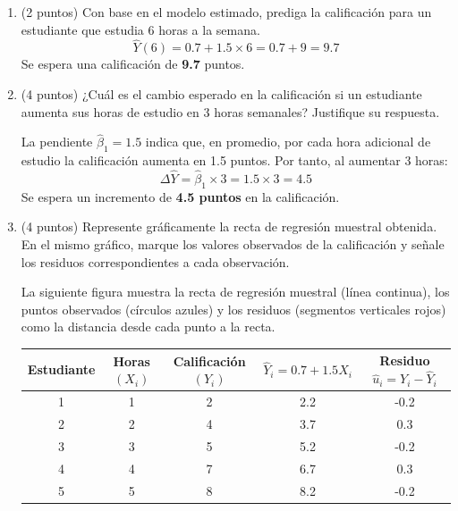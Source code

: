 \documentclass[10pt,a4paper]{article}
\begin{document}
\begin{enumerate}
\begin{enumerate}
{\color{blue} \[
\bar{X} = \frac{1+2+3+4+5}{5} = \frac{15}{5}=3, \qquad 
\bar{Y} = \frac{2+4+5+7+8}{5} = \frac{26}{5}=5.2
\]

\[
\begin{aligned}
\sum (X_i-\bar{X})(Y_i-\bar{Y}) &= (1-3)(2-5.2)+(2-3)(4-5.2)+(3-3)(5-5.2)\\
&\quad +(4-3)(7-5.2)+(5-3)(8-5.2)\\
&= (-2)(-3.2)+(-1)(-1.2)+(0)(-0.2)+(1)(1.8)+(2)(2.8)\\
&= 6.4+1.2+0+1.8+5.6 = 15
\end{aligned}
\]

\[
\sum (X_i-\bar{X})^2 = (-2)^2+(-1)^2+0^2+1^2+2^2 = 4+1+0+1+4 = 10
\]

\[
\hat{\beta}_1 = \frac{15}{10} = 1.5, \qquad 
\hat{\beta}_0 = \bar{Y} - \hat{\beta}_1\bar{X} = 5.2 - 1.5\cdot3 = 5.2 - 4.5 = 0.7
\]

Por lo tanto, el modelo estimado es:
\[
\boxed{\hat{Y}_i = 0.7 + 1.5\,X_i}
\]}


\item (2 puntos)  Con base en el modelo estimado, prediga la calificación para un estudiante que estudia 6 horas a la semana. 
{\color{blue}
\[
\hat{Y}(6) = 0.7 + 1.5 \times 6 = 0.7 + 9 = 9.7
\]
Se espera una calificación de \textbf{9.7} puntos.}


\item  (4 puntos) ¿Cuál es el cambio esperado en la calificación si un estudiante aumenta sus horas de estudio en 3 horas semanales? Justifique su respuesta.

{\color{blue}
La pendiente $\hat{\beta}_1 = 1.5$ indica que, en promedio, por cada hora adicional de estudio la calificación aumenta en 1.5 puntos. Por tanto, al aumentar 3 horas:
\[
\Delta \hat{Y} = \hat{\beta}_1 \times 3 = 1.5 \times 3 = 4.5
\]
Se espera un incremento de \textbf{4.5 puntos} en la calificación.

}
\item (4 puntos) Represente gráficamente la recta de regresión muestral obtenida. En el mismo
gráfico, marque los valores observados de la calificación y señale los residuos correspondientes a
cada observación.


La siguiente figura muestra la recta de regresión muestral (línea continua), los puntos observados (círculos azules) y los residuos (segmentos verticales rojos) como la distancia desde cada punto a la recta.

\begin{table}[h]
\centering
{\color{blue!80}
\begin{tabular}{c|c|c|c|c}
Estudiante & Horas $(X_i)$ & Calificación $(Y_i)$ & $\hat{Y}_i = 0.7 + 1.5X_i$ & Residuo $\hat{u}_i = Y_i - \hat{Y}_i$ \\
\hline
1 & 1 & 2 & 2.2 & -0.2 \\
2 & 2 & 4 & 3.7 & 0.3 \\
3 & 3 & 5 & 5.2 & -0.2 \\
4 & 4 & 7 & 6.7 & 0.3 \\
5 & 5 & 8 & 8.2 & -0.2 \\
\end{tabular}
}
\end{table}


\end{enumerate}
\end{enumerate}
\end{document}
